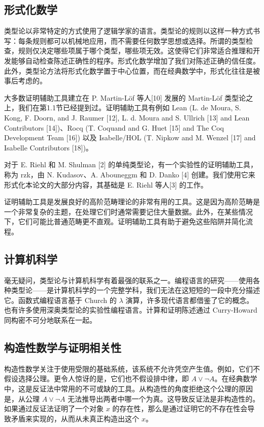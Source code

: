 \documentclass{ctexrep}
\theoremstyle{plain}
\theoremstyle{definition}
\theoremstyle{remark}
\theoremstyle{definition}
\theoremstyle{definition}
\theoremstyle{definition}
\begin{document}
\subsection{形式化数学}

类型论以非常特定的方式使用了逻辑学家的语言。类型论的规则以这样一种方式书写：每条规则都可以机械地应用，而不需要任何数学思想或选择。所谓的类型检查，规则仅决定哪些项属于哪个类型，哪些项无效。这使得它们非常适合推理和开发能够自动检查陈述正确性的程序。形式化数学增加了我们对陈述正确的信任度。此外，类型论方法将形式化数学置于中心位置，而在经典数学中，形式化往往是被事后考虑的。

大多数证明辅助工具建立在 P. Martin-Löf 等人[10] 发展的 Martin-Löf 类型论之上，我们在第1.1节已经提到过。证明辅助工具有例如 Lean (L. de Moura, S. Kong, F. Doorn, and J. Raumer [12], L. d. Moura and S. Ullrich [13] and Lean Contributors [14])、Rocq (T. Coquand and G. Huet [15] and The Coq Development Team [16]) 以及 Isabelle/HOL (T. Nipkow and M. Wenzel [17] and Isabelle Contributors [18])。

对于 E. Riehl 和 M. Shulman [2] 的单纯类型论，有一个实验性的证明辅助工具，称为 \textsf{rzk}，由 N. Kudasov、A. Abouneggm 和 D. Danko [4] 创建。我们使用它来形式化本论文的大部分内容，其基础是 E. Riehl 等人[3] 的工作。

证明辅助工具是发展良好的高阶范畴理论的非常有用的工具。这是因为高阶范畴是一个非常复杂的主题，在处理它们时通常需要记住大量数据。此外，在某些情况下，它们可能比普通范畴更不直观。证明辅助工具有助于避免这些陷阱并简化流程。

\subsection{计算机科学}

毫无疑问，类型论与计算机科学有着最强的联系之一。编程语言的研究——使用各种类型论——是计算机科学的一个完整学科，我们无法在这短短的一段中充分描述它。函数式编程语言基于 Church 的 $\lambda$ 演算，许多现代语言都借鉴了它的概念。也有许多使用深奥类型论的实验性编程语言。计算和证明陈述通过 Curry-Howard 同构密不可分地联系在一起。

\subsection{构造性数学与证明相关性}

构造性数学关注于使用受限的基础系统，该系统不允许凭空产生值。例如，它们不假设选择公理。更令人惊讶的是，它们也不假设排中律，即 $A \lor \neg A$。在经典数学中，这是反证法中常用的不可或缺的工具。从构造性的角度拒绝这个公理的原因是，从公理 $A \lor \neg A$ 无法推导出两者中哪一个为真。这导致反证法是非构造性的。如果通过反证法证明了一个对象 $x$ 的存在性，那么是通过证明它的不存在性会导致矛盾来实现的，从而从未真正构造出这个 $x$。
\end{document}
